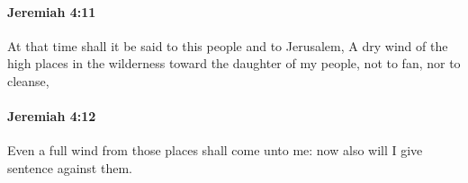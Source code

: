 		\paragraph{Jeremiah 4:11} %
			\label{JEREMIAH-4-11}

			At that time shall it be said to this people and to Jerusalem, A dry wind of the high places in the wilderness toward the daughter of my people, not to fan, nor to cleanse,


		\paragraph{Jeremiah 4:12} %
			\label{JEREMIAH-4-12}

			Even a full wind from those places shall come unto me: now also will I give sentence against them.


